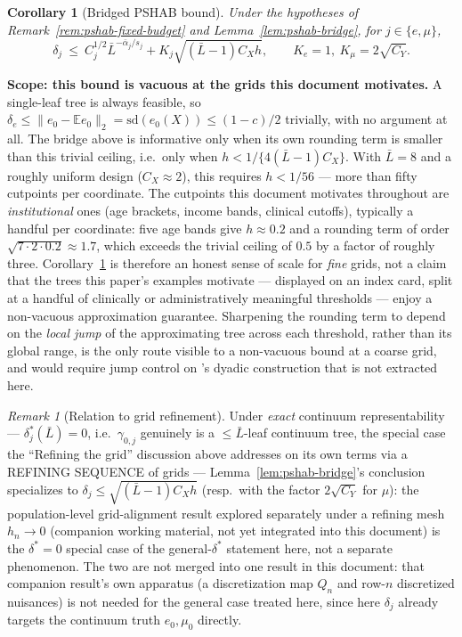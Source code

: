 \documentclass[11pt]{article}
\theoremstyle{plain}
\newtheorem{corollary}[theorem]{Corollary}
\theoremstyle{definition}
\theoremstyle{remark}
\newtheorem{remark}[theorem]{Remark}
\newcommand{\E}{\mathbb{E}}
\newcommand{\ez}{e_0}
\newcommand{\mz}{\mu_0}
\newcommand{\Ltwo}[1]{\lVert #1 \rVert_{2}}
\begin{document}
\begin{corollary}[Bridged PSHAB bound]\label{cor:pshab-bridge}
Under the hypotheses of Remark~\ref{rem:pshab-fixed-budget} and
Lemma~\ref{lem:pshab-bridge}, for $j\in\{e,\mu\}$,
\[
  \delta_j\ \le\ C_j^{1/2}\bar L^{-\bar\alpha_j/s_j}+K_j\sqrt{(\bar L-1)C_Xh},
  \qquad K_e=1,\ K_\mu=2\sqrt{C_Y}.
\]
\end{corollary}

\noindent\textbf{Scope: this bound is vacuous at the grids this document
motivates.} A single-leaf tree is always feasible, so
$\delta_e\le\Ltwo{\ez-\E\ez}=\mathrm{sd}(\ez(X))\le(1-c)/2$ trivially, with no
argument at all. The bridge above is informative only when its own rounding
term is smaller than this trivial ceiling, i.e.\ only when
$h<1/\{4(\bar L-1)C_X\}$. With $\bar L=8$ and a roughly uniform design
($C_X\approx2$), this requires $h<1/56$ --- more than fifty cutpoints per
coordinate. The cutpoints this document motivates throughout are
\emph{institutional} ones (age brackets, income bands, clinical cutoffs),
typically a handful per coordinate: five age bands give $h\approx0.2$ and a
rounding term of order $\sqrt{7\cdot2\cdot0.2}\approx1.7$, which exceeds the
trivial ceiling of $0.5$ by a factor of roughly three. Corollary~\ref{cor:pshab-bridge} is therefore an honest sense of scale for
\emph{fine} grids, not a claim that the trees this paper's examples
motivate --- displayed on an index card, split at a handful of clinically or
administratively meaningful thresholds --- enjoy a non-vacuous approximation
guarantee. Sharpening the rounding term to depend on the \emph{local jump}
of the approximating tree across each threshold, rather than its global
range, is the only route visible to a non-vacuous bound at a coarse grid,
and would require jump control on \citet{xu2026}'s dyadic construction that
is not extracted here.

\begin{remark}[Relation to grid refinement]
Under \emph{exact} continuum representability --- $\delta_j^*(\bar L)=0$,
i.e.\ $\gamma_{0,j}$ genuinely is a $\le\bar L$-leaf continuum tree, the
special case the ``Refining the grid'' discussion above addresses on its own
terms via a REFINING SEQUENCE of grids --- Lemma~\ref{lem:pshab-bridge}'s
conclusion specializes to $\delta_j\le\sqrt{(\bar L-1)C_Xh}$ (resp.\ with the
factor $2\sqrt{C_Y}$ for $\mu$): the population-level grid-alignment result
explored separately under a refining mesh $h_n\to0$ (companion working
material, not yet integrated into this document) is the $\delta^*=0$
special case of the general-$\delta^*$ statement here, not a separate
phenomenon. The two are not merged into one result in this document: that
companion result's own apparatus (a discretization map $Q_n$ and row-$n$
discretized nuisances) is not needed for the general case treated here,
since here $\delta_j$ already targets the continuum truth $\ez,\mz$
directly.
\end{remark}
\end{document}
